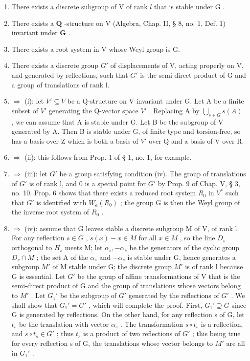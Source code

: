 \begin{enumerate}
\def\labelenumi{(\roman{enumi})}
\item
  There exists a discrete subgroup of \(\mathrm{V}\) of rank \(l\) that is stable under \(\mathrm{G}\) .
\item
  There exists a \(\mathbf{Q}\) -structure on V (Algebra, Chap. II, § 8, no. 1, Def. 1) invariant under \(\mathbf{G}\) .
\item
  There exists a root system in V whose Weyl group is G.
\item
  There exists a discrete group \(G'\) of displacements of V, acting properly on V, and generated by reflections, such that \(G'\) is the semi-direct product of G and a group of translations of rank l.
\item
  \(\Longrightarrow\) (i): let \(V' \subseteq V\) be a Q-structure on V invariant under G. Let A be a finite subset of \(V'\) generating the Q-vector space \(V'\) . Replacing A by \(\bigcup_{s \in G} s(A)\) , we can assume that A is stable under G. Let B be the subgroup of V generated by A. Then B is stable under G, of finite type and torsion-free, so has a basis over Z which is both a basis of \(V'\) over Q and a basis of V over R.
\item
  \(\Longrightarrow\) (ii): this follows from Prop. 1 of § 1, no. 1, for example.
\item
  \(\Longrightarrow\) (iii): let \(G'\) be a group satisfying condition (iv). The group of translations of \(G'\) is of rank l, and 0 is a special point for \(G'\) by Prop. 9 of Chap. V, § 3, no. 10. Prop. 6 shows that there exists a reduced root system \(R_{0}\) in \(V^{*}\) such that \(G'\) is identified with \(W_{a}(R_{0})\) ; the group G is then the Weyl group of the inverse root system of \(R_{0}\) .
\item
  \(\Longrightarrow\) (iv): assume that G leaves stable a discrete subgroup M of V, of rank l. For any reflection \(s \in G\) , \(s(x) - x \in M\) for all \(x \in M\) , so the line \(D_{s}\) orthogonal to \(H_{s}\) meets M; let \(\alpha_{s}, -\alpha_{s}\) be the generators of the cyclic group \(D_{s} \cap M\) ; the set A of the \(\alpha_{s}\) and \(-\alpha_{s}\) is stable under G, hence generates a subgroup \(M'\) of M stable under G; the discrete group \(M'\) is of rank l because G is essential. Let \(G'\) be the group of affine transformations of V that is the semi-direct product of G and the group of translations whose vectors belong to \(M'\) . Let \(G_{1}'\) be the subgroup of \(G'\) generated by the reflections of \(G'\) . We shall show that \(G_{1}' = G'\) , which will complete the proof. First, \(G_{1}' \supseteq G\) since G is generated by reflections. On the other hand, for any reflection s of G, let \(t_{s}\) be the translation with vector \(\alpha_{s}\) . The transformation \(s \circ t_{s}\) is a reflection, and \(s \circ t_{s} \in G'\) ; thus \(t_{s}\) is a product of two reflections of \(G'\) ; this being true for every reflection s of G, the translations whose vector belongs to \(M'\) are all in \(G_{1}'\) .
\end{enumerate}

